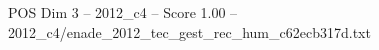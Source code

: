 \begin{textsample}{POS Dim 3 – 2012\_c4 – Score 1.00 – 2012\_c4/enade\_2012\_tec\_gest\_rec\_hum\_c62ecb317d.txt}
\end{textsample}
